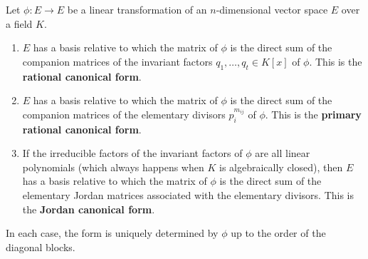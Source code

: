 Let $\phi : E \to E$ be a linear transformation of an $n$-dimensional vector space $E$ over a field $K$.
\begin{enumerate}
\item $E$ has a basis relative to which the matrix of $\phi$ is the direct sum of the companion matrices of the invariant factors $q_1, \ldots, q_t \in K[x]$ of $\phi$. This is the \textbf{rational canonical form}.
\item $E$ has a basis relative to which the matrix of $\phi$ is the direct sum of the companion matrices of the elementary divisors $p_i^{m_{ij}}$ of $\phi$. This is the \textbf{primary rational canonical form}.
\item If the irreducible factors of the invariant factors of $\phi$ are all linear polynomials (which always happens when $K$ is algebraically closed), then $E$ has a basis relative to which the matrix of $\phi$ is the direct sum of the elementary Jordan matrices associated with the elementary divisors. This is the \textbf{Jordan canonical form}.
\end{enumerate}
In each case, the form is uniquely determined by $\phi$ up to the order of the diagonal blocks.
